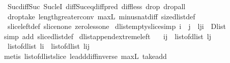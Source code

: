 \begin{isabellebody}
\ \ Suc{\isacharunderscore}diff{\isacharunderscore}Suc\ Suc{\isacharunderscore}leI\ diff{\isacharunderscore}Suc{\isacharunderscore}eq{\isacharunderscore}diff{\isacharunderscore}pred\ diff{\isacharunderscore}less\ drop{\isacharunderscore}{}\ drop{\isacharunderscore}all\ \isanewline
\ \ drop{\isacharunderscore}take\ length{\isacharunderscore}greater{\isacharunderscore}{}{\isacharunderscore}conv\ max{\isacharunderscore}{}L\ minus{\isacharunderscore}nat{\isachardot}diff{\isacharunderscore}{}\ size{\isacharunderscore}dlist{\isacharunderscore}def\ \isanewline
\ \ slice{\isacharunderscore}left{\isacharunderscore}def\ slice{\isacharunderscore}none\ zero{\isacharunderscore}less{\isacharunderscore}one{\isacharparenright}%
\endisatagproof
{\isafoldproof}%
%
\isadelimproof
\isanewline
%
\endisadelimproof
\isanewline
{}\isamarkupfalse%
\ dlist{\isacharunderscore}empty{\isacharunderscore}slice{\isacharbrackleft}simp{\isacharbrackright}{\isacharcolon}\ {\isachardoublequoteopen}i\ {\isasymle}\ j\ {\isasymLongrightarrow}\ {\isacharparenleft}l{\isasymdagger}j{\isachardot}{\isachardot}i{\isacharparenright}\ {\isacharequal}\ Dlist\ {\isacharbrackleft}{\isacharbrackright}{\isachardoublequoteclose}\isanewline
%
\isadelimproof
%
\endisadelimproof
%
\isatagproof
{}\isamarkupfalse%
\ {\isacharparenleft}simp\ add{\isacharcolon}\ slice{\isacharunderscore}dlist{\isacharunderscore}def{\isacharparenright}%
\endisatagproof
{\isafoldproof}%
%
\isadelimproof
\isanewline
%
\endisadelimproof
\isanewline
{}\isamarkupfalse%
\ dlist{\isacharunderscore}append{\isacharunderscore}extreme{\isacharunderscore}left{\isacharcolon}\ \isanewline
\ \ {\isachardoublequoteopen}i{\isasymle}j\ {\isasymLongrightarrow}\ list{\isacharunderscore}of{\isacharunderscore}dlist\ {\isacharparenleft}l{\isasymdagger}{\isachardot}{\isachardot}j{\isacharparenright}\ {\isacharequal}\ \isanewline
\ \ {\isacharparenleft}list{\isacharunderscore}of{\isacharunderscore}dlist\ {\isacharparenleft}l{\isasymdagger}{\isachardot}{\isachardot}i{\isacharparenright}{\isacharparenright}\ {\isacharat}\ {\isacharparenleft}list{\isacharunderscore}of{\isacharunderscore}dlist\ {\isacharparenleft}l{\isasymdagger}i{\isachardot}{\isachardot}j{\isacharparenright}{\isacharparenright}{\isachardoublequoteclose}\isanewline
%
\isadelimproof
%
\endisadelimproof
%
\isatagproof
{}\isamarkupfalse%
\ {\isacharparenleft}metis\ list{\isacharunderscore}of{\isacharunderscore}dlist{\isacharunderscore}slice\ le{\isacharunderscore}add{\isacharunderscore}diff{\isacharunderscore}inverse\ max{\isacharunderscore}{}L\ take{\isacharunderscore}add\ \isanewline

\end{isabellebody}
